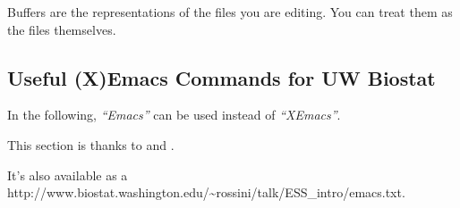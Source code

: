 \documentclass{article}
\begin{document}
Buffers are the representations of the files you are editing.  You can
treat them as the files themselves.


\subsection{Useful (X)Emacs Commands for UW Biostat}
\label{sec:emacs:uwbiostat}

In the following, \emph{``Emacs''} can be used instead of
\emph{``XEmacs''}.

This section is thanks to  and
.

It's also available as a 
{http://www.biostat.washington.edu/\~{}rossini/talk/ESS\_intro/emacs.txt}.
\end{document}
